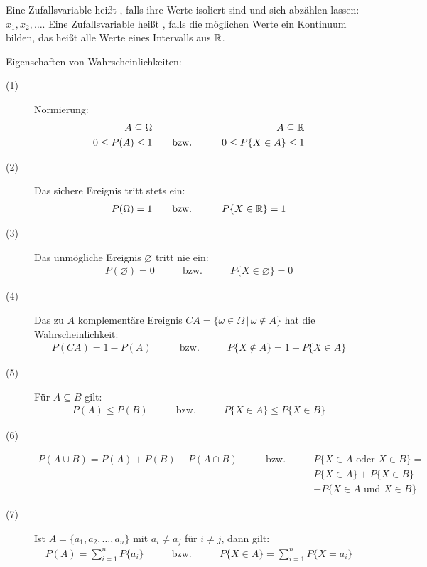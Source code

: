 Eine Zufallsvariable heißt , falls ihre Werte isoliert sind und sich abzählen lassen: $x_1, x_2, \dots$. Eine Zufallsvariable heißt , falls die möglichen Werte ein Kontinuum bilden, das heißt alle Werte eines Intervalls aus $\mathbb{R}$.

Eigenschaften von Wahrscheinlichkeiten:
\begin{description}
    \item[(1)]{Normierung:
    \begin{align*}
        A \subseteq \Omega & & A \subseteq \mathbb{R} \\
        0 \leq P(A) \leq 1 & \qquad\text{bzw.}\qquad & 0 \leq P\{X \in A\} \leq 1
    \end{align*}}
    \item[(2)]{Das sichere Ereignis tritt stets ein:
    \begin{align*}
        P(\Omega) = 1 & \qquad\text{bzw.}\qquad & P\{X \in \mathbb{R}\} = 1
    \end{align*}}
    \item[(3)]{Das unmögliche Ereignis $\varnothing$ tritt nie ein:
    \begin{align*}
        P(\varnothing) = 0 & \qquad\text{bzw.}\qquad & P\{X \in \varnothing\} = 0
    \end{align*}}
    \item[(4)]{Das zu $A$ komplementäre Ereignis $CA = \{\omega \in \Omega \,|\, \omega \not \in A\}$ hat die Wahrscheinlichkeit:
    \begin{align*}
        P(CA) = 1 - P(A) & \qquad\text{bzw.}\qquad & P\{X \not \in A\} = 1 - P\{X \in A\}
    \end{align*}}
    \item[(5)]{Für $A \subseteq B$ gilt:
    \begin{align*}
        P(A) \leq P(B) & \qquad\text{bzw.}\qquad & P\{X \in A\} \leq P\{X \in B\}
    \end{align*}}
    \item[(6)]{\begin{align*}
        P(A \cup B) = P(A) + P(B) - P(A \cap B) & \qquad\text{bzw.}\qquad & P\{X \in A\text{ oder }X \in B\} = \\
        & & P\{X \in A\} + P\{X \in B\} \\
        & & - P\{X \in A\text{ und }X \in B\}
    \end{align*}}
    \item[(7)]{Ist $A = \{a_1, a_2, \dots, a_n\}$ mit $a_i \neq a_j$ für $i \neq j$, dann gilt:
    \begin{align*}
        P(A) = \sum_{i = 1}^{n} P\{a_i\} & \qquad\text{bzw.}\qquad & P\{X \in A\} = \sum_{i = 1}^{n} P\{X = a_i\}
    \end{align*}}
\end{description}

